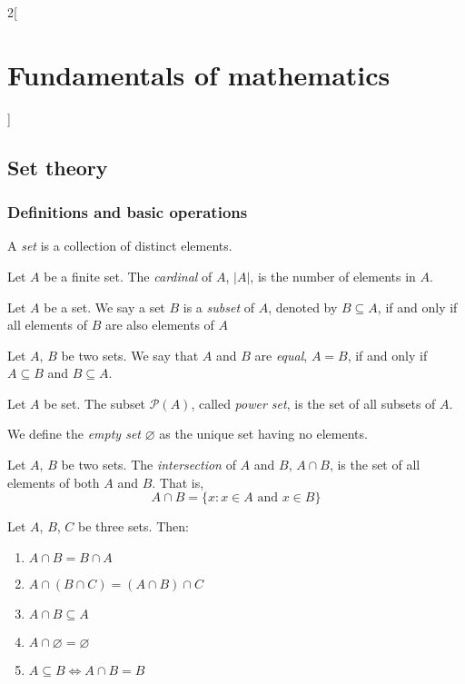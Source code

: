 \documentclass[../../../main_math.tex]{subfiles}
\begin{document}
\begin{multicols}{2}[\section{Fundamentals of mathematics}]
  \subsection{Set theory}
  \subsubsection{Definitions and basic operations}
  \begin{definition}
    A \emph{set} is a collection of distinct elements.
  \end{definition}
  \begin{definition}
    Let $A$ be a finite set. The \emph{cardinal} of $A$, $|A|$, is the number of elements in $A$.
  \end{definition}
  \begin{definition}
    Let $A$ be a set. We say a set $B$ is a \emph{subset} of $A$, denoted by $B\subseteq A$, if and only if all elements of $B$ are also elements of $A$
  \end{definition}
  \begin{axiom}
    Let $A$, $B$ be two sets. We say that $A$ and $B$ are \emph{equal}, $A=B$, if and only if $A\subseteq B$ and $B\subseteq A$.
  \end{axiom}
  \begin{definition}
    Let $A$ be set. The subset $\mathcal{P}(A)$, called \emph{power set}, is the set of all subsets of $A$.
  \end{definition}
  \begin{definition}
    We define the \emph{empty set} $\varnothing$ as the unique set having no elements.
  \end{definition}
  \begin{definition}
    Let $A$, $B$ be two sets. The \emph{intersection} of $A$ and $B$, $A\cap B$, is the set of all elements of both $A$ and $B$. That is, $$A\cap B=\{x:x\in A\text{ and }x\in B\}$$
  \end{definition}
  \begin{proposition}
    Let $A$, $B$, $C$ be three sets. Then:
    \begin{enumerate}
      \item $A\cap B=B\cap A$
      \item $A\cap(B\cap C)=(A\cap B)\cap C$
      \item $A\cap B\subseteq A$
      \item $A\cap\varnothing=\varnothing$
      \item $A\subseteq B\iff A\cap B=B$

\end{enumerate}
\end{proposition}
\end{multicols}
\end{document}
